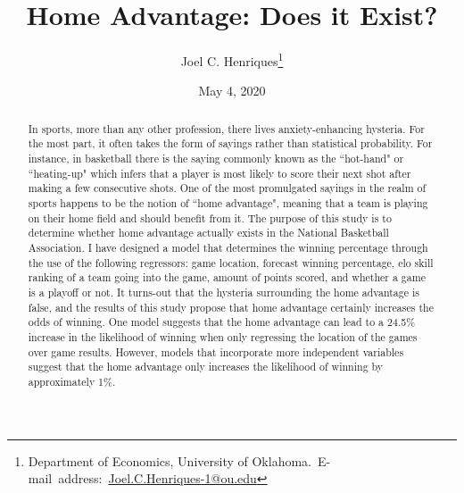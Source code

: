 \documentclass[12pt,english]{article}
\begin{document}
\begin{singlespace}
\title{Home Advantage: Does it Exist?}
\end{singlespace}

\author{Joel C. Henriques\thanks{Department of Economics, University of Oklahoma.\
E-mail~address:~\href{mailto:student.name@ou.edu}{Joel.C.Henriques-1@ou.edu}}}

\date{May 4, 2020}

\maketitle

\begin{abstract}
\begin{singlespace}
In sports, more than any other profession, there lives anxiety-enhancing hysteria. For the most part, it often takes the form of sayings rather than statistical probability. For instance, in basketball there is the saying commonly known as the “hot-hand" or “heating-up" which infers that a player is most likely to score their next shot after making a few consecutive shots. One of the most promulgated sayings in the realm of sports happens to be the notion of “home advantage", meaning that a team is playing on their home field and should benefit from it. The purpose of this study is to determine whether home advantage actually exists in the National Basketball Association. I have designed a model that determines the winning percentage through the use of the following regressors: game location, forecast winning percentage, elo skill ranking of a team going into the game, amount of points scored, and whether a game is a playoff or not. It turns-out that the hysteria surrounding the home advantage is false, and the results of this study propose that home advantage certainly increases the odds of winning. One model suggests that the home advantage can lead to a 24.5\% increase in the likelihood of winning when only regressing the location of the games over game results. However, models that incorporate more independent variables suggest that the home advantage only increases the likelihood of winning by approximately 1\%. 
\end{singlespace}

\end{abstract}
\vfill{}


\pagebreak{}
\end{document}
